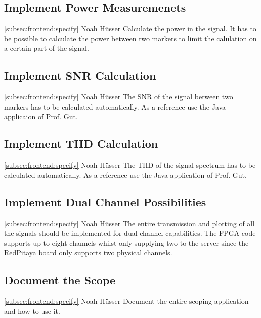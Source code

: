 \documentclass[a4paper,oneside]{alpenspecs/alpenspecs}
\begin{document}
\subsection{Implement Power Measuremenets}
\label{subsec:frontend:}
\wpac
    {}
    {}
    {}
    {\ref{subsec:frontend:specify}}
    {}
    {Noah Hüsser}
    {%
        Calculate the power in the signal.
        It has to be possible to calculate the power between two markers to limit the calulation on a certain part of the signal.
    }

\subsection{Implement SNR Calculation}
\label{subsec:frontend:}
\wpac
    {}
    {}
    {}
    {\ref{subsec:frontend:specify}}
    {}
    {Noah Hüsser}
    {%
        The SNR of the signal between two markers has to be calculated automatically.
        As a reference use the Java applicaion of Prof. Gut.
    }

\subsection{Implement THD Calculation}
\label{subsec:frontend:}
\wpac
    {}
    {}
    {}
    {\ref{subsec:frontend:specify}}
    {}
    {Noah Hüsser}
    {%
        The THD of the signal spectrum has to be calculated automatically.
        As a reference use the Java application of Prof. Gut.
    }

\subsection{Implement Dual Channel Possibilities}
\label{subsec:frontend:}
\wpac
    {}
    {}
    {}
    {\ref{subsec:frontend:specify}}
    {}
    {Noah Hüsser}
    {%
        The entire transmission and plotting of all the signals should be implemented for dual channel capabilities.
        The FPGA code supports up to eight channels whilst only supplying two to the server since the RedPitaya board only supports two physical channels.
    }

\subsection{Document the Scope}
\label{subsec:frontend:}
\wpac
    {}
    {}
    {}
    {\ref{subsec:frontend:specify}}
    {}
    {Noah Hüsser}
    {%
        Document the entire scoping application and how to use it.
    }


\backmatter
\end{document}
